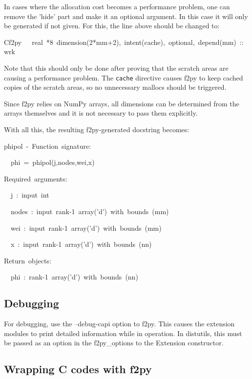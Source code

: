 In cases where the allocation cost becomes a performance problem,
one can remove the 'hide' part and make it an optional argument. In
this case it will only be generated if not given. For this, the line
above should be changed to:

\begin{lyxcode}
{\small Cf2py~~~real~{*}8~dimension(2{*}mm+2),~intent(cache),~optional,~depend(mm)~::~wrk~}{\small \par}
\end{lyxcode}
Note that this should only be done after proving that the scratch
areas are causing a performance problem. The \texttt{cache} directive
causes f2py to keep cached copies of the scratch areas, so no unnecessary
mallocs should be triggered.

Since f2py relies on NumPy arrays, all dimensions can be determined from the
arrays themselves and it is not necessary to pass them explicitly.

With all this, the resulting f2py-generated docstring becomes: 

\begin{lyxcode}
phipol~-~Function~signature:

~~phi~=~phipol(j,nodes,wei,x)

Required~arguments:

~~j~:~input~int

~~nodes~:~input~rank-1~array('d')~with~bounds~(mm)

~~wei~:~input~rank-1~array('d')~with~bounds~(mm)

~~x~:~input~rank-1~array('d')~with~bounds~(nn)

Return~objects:

~~phi~:~rank-1~array('d')~with~bounds~(nn)
\end{lyxcode}

\subsection{Debugging}

For debugging, use the --debug-capi option to f2py. This causes the
extension modules to print detailed information while in operation.
In distutils, this must be passed as an option in the f2py\_options
to the Extension constructor. 


\subsection{Wrapping C codes with f2py}

